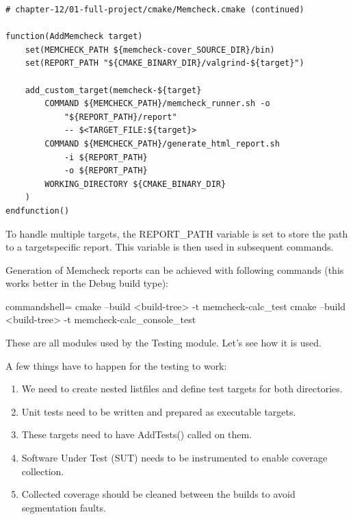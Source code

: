\begin{lstlisting}[style=styleCMake]
# chapter-12/01-full-project/cmake/Memcheck.cmake (continued)

function(AddMemcheck target)
	set(MEMCHECK_PATH ${memcheck-cover_SOURCE_DIR}/bin)
	set(REPORT_PATH "${CMAKE_BINARY_DIR}/valgrind-${target}")
	
	add_custom_target(memcheck-${target}
		COMMAND ${MEMCHECK_PATH}/memcheck_runner.sh -o
			"${REPORT_PATH}/report"
			-- $<TARGET_FILE:${target}>
		COMMAND ${MEMCHECK_PATH}/generate_html_report.sh
			-i ${REPORT_PATH}
			-o ${REPORT_PATH}
		WORKING_DIRECTORY ${CMAKE_BINARY_DIR}
	)
endfunction()
\end{lstlisting}

To handle multiple targets, the REPORT\_PATH variable is set to store the path to a targetspecific report. This variable is then used in subsequent commands.

Generation of Memcheck reports can be achieved with following commands (this works better in the Debug build type):

\begin{tcblisting}{commandshell={}}
cmake --build <build-tree> -t memcheck-calc_test
cmake --build <build-tree> -t memcheck-calc_console_test
\end{tcblisting}

These are all modules used by the Testing module. Let's see how it is used.


A few things have to happen for the testing to work:

\begin{enumerate}
\item 
We need to create nested listfiles and define test targets for both directories.

\item 
Unit tests need to be written and prepared as executable targets.

\item 
These targets need to have AddTests() called on them.

\item 
Software Under Test (SUT) needs to be instrumented to enable coverage collection.

\item 
Collected coverage should be cleaned between the builds to avoid segmentation faults.
\end{enumerate}

